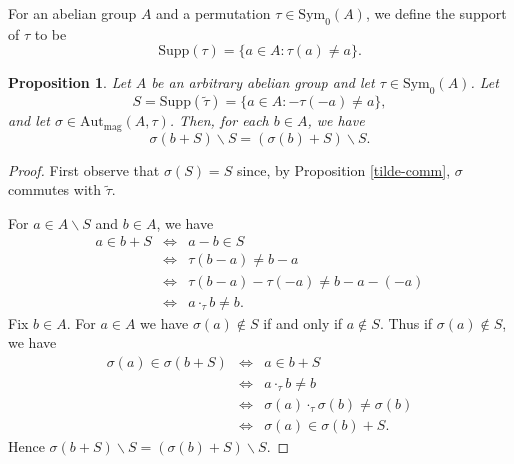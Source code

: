 \documentclass[letterpaper,12pt]{amsart}
\numberwithin{equation}{section}
\numberwithin{algorithm}{section}
\newtheorem{proposition}[lemma]{Proposition}
\theoremstyle{definition}
\newcommand{\LRA}{\Leftrightarrow}
\newcommand{\Autmag}{\mathrm{Aut}_\mathrm{mag}}
\newcommand{\Symo}{\mathrm{Sym}_0}
\newcommand{\ttau}{\tilde{\tau}}
\newcommand{\bs}{\backslash}
\newcommand{\Supp}{\mathrm{Supp}}
\begin{document}
For an abelian group $A$ and a permutation $\tau \in \Symo(A)$, we define the support of $\tau$ to be
$$ \Supp(\tau) = \{a \in A : \tau(a) \neq a \}. $$

\begin{proposition} \label{S-lem}
Let $A$ be an arbitrary abelian group and let $\tau \in \Symo(A)$. Let
$$ S= \Supp(\ttau) = \{ a \in A : -\tau(-a) \neq a \},  $$
and let $\sigma \in \Autmag(A,\tau)$. Then, for each $b \in A$, we have  
	$$ \sigma(b+S) \backslash S =(\sigma(b)+S) \backslash S. $$
\end{proposition}
\begin{proof}
First observe that $\sigma(S)=S$ since, by Proposition \ref{tilde-comm}, $\sigma$ commutes with $\ttau$. 

For $a \in A \bs S$ and $b \in A$, we have 
\begin{eqnarray*}
  a \in b+S & \LRA & a-b \in S \\
  			& \LRA & \tau(b-a) \neq b-a \\
            & \LRA & \tau(b-a) - \tau(-a) \neq b-a -(-a) \\
            & \LRA & a \cdot_\tau b \neq b.
\end{eqnarray*}
Fix $b \in A$. For $a \in A$ we have $\sigma(a) \not \in S$ if and only if $a \not \in S$. Thus if $\sigma(a) \not \in S$, we have 
\begin{eqnarray*}
	\sigma(a) \in \sigma(b+S) & \LRA & a \in b+S \\
	                          & \LRA & a \cdot_\tau b \neq b \\
	                          & \LRA & \sigma(a) \cdot_\tau \sigma(b) \neq \sigma(b) \\
	                          & \LRA & \sigma(a)  \in \sigma(b) + S.
\end{eqnarray*}
Hence $\sigma(b+S) \bs S = (\sigma(b)+S) \bs S$.
\end{proof}
\end{document}
